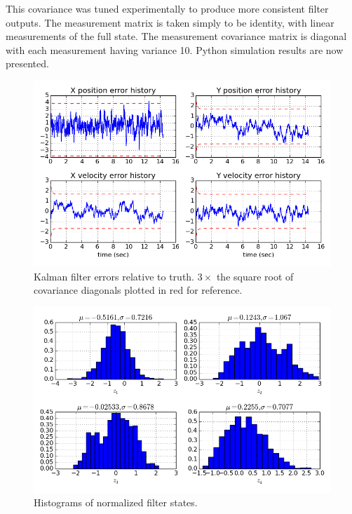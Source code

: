This covariance was tuned experimentally to produce more consistent filter outputs.
The measurement matrix is taken simply to be identity, with linear measurements of the full state.
The measurement covariance matrix is diagonal with each measurement having variance 10.
Python simulation results are now presented.

\begin{figure}[tb!]
\centering
\includegraphics[width=\textwidth]{kf_errors}
\caption{Kalman filter errors relative to truth. $3\times$ the square root of covariance diagonals plotted in red for reference.}
\label{fig:kf_errors}
\end{figure}

\begin{figure}[tb!]
\centering
\includegraphics[width=\textwidth]{kf_consistency}
\caption{Histograms of normalized filter states.}
\label{fig:kf_consistency}
\end{figure}

